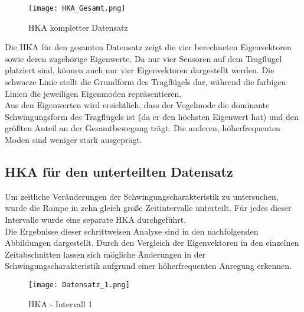         \begin{figure}[H]
            \centering
            \texttt{[image: HKA\_Gesamt.png]}
            \caption{HKA kompletter Datensatz}
            \label{fig: HKA gesmat}
        \end{figure}

        \noindent
        Die HKA für den gesamten Datensatz zeigt die vier berechneten Eigenvektoren sowie deren 
        zugehörige Eigenwerte. Da nur vier Sensoren auf dem Tragflügel platziert sind, können 
        auch nur vier Eigenvektoren dargestellt werden. Die schwarze Linie stellt die Grundform 
        des Tragflügels dar, während die farbigen Linien die jeweiligen Eigenmoden repräsentieren.
        \\

        \noindent
        Aus den Eigenwerten wird ersichtlich, dass der \glqq Vogelmode\grqq
        \hspace{0.05cm} die dominante Schwingungsform
        des Tragflügels ist (da er den höchsten Eigenwert hat) und den größten
        Anteil an der Gesamtbewegung trägt. Die anderen, höherfrequenten Moden
        sind weniger stark ausgeprägt.
    
    \subsection{HKA für den unterteilten Datensatz}
        Um zeitliche Veränderungen der Schwingungscharakteristik zu untersuchen, wurde die Rampe 
        in zehn gleich große Zeitintervalle unterteilt. Für jedes dieser Intervalle wurde eine 
        separate HKA durchgeführt.
        \\ 

        \noindent
        Die Ergebnisse dieser schrittweisen Analyse sind in den nachfolgenden Abbildungen dargestellt. 
        Durch den Vergleich der Eigenvektoren in den einzelnen Zeitabschnitten lassen sich mögliche 
        Änderungen in der Schwingungscharakteristik aufgrund einer höherfrequenten Anregung erkennen.

        \begin{figure}[H]
            \centering
            \texttt{[image: Datensatz\_1.png]}
            \caption{HKA - Intervall 1}
            \label{fig: HKA_intervall_1}
        \end{figure}

